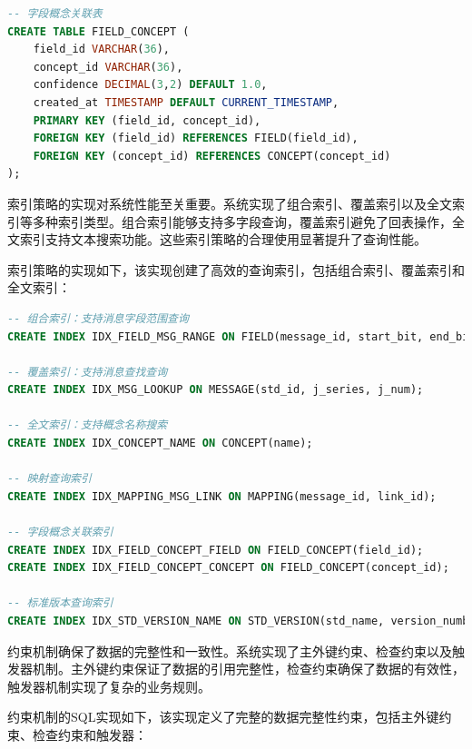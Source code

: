\begin{lstlisting}[language=SQL, label=fig:database_schema]
-- 字段概念关联表
CREATE TABLE FIELD_CONCEPT (
    field_id VARCHAR(36),
    concept_id VARCHAR(36),
    confidence DECIMAL(3,2) DEFAULT 1.0,
    created_at TIMESTAMP DEFAULT CURRENT_TIMESTAMP,
    PRIMARY KEY (field_id, concept_id),
    FOREIGN KEY (field_id) REFERENCES FIELD(field_id),
    FOREIGN KEY (concept_id) REFERENCES CONCEPT(concept_id)
);
\end{lstlisting}

索引策略的实现对系统性能至关重要。系统实现了组合索引、覆盖索引以及全文索引等多种索引类型。组合索引能够支持多字段查询，覆盖索引避免了回表操作，全文索引支持文本搜索功能。这些索引策略的合理使用显著提升了查询性能。

索引策略的实现如下，该实现创建了高效的查询索引，包括组合索引、覆盖索引和全文索引：

\begin{lstlisting}[language=SQL, label=fig:database_indexes]
-- 组合索引：支持消息字段范围查询
CREATE INDEX IDX_FIELD_MSG_RANGE ON FIELD(message_id, start_bit, end_bit);

-- 覆盖索引：支持消息查找查询
CREATE INDEX IDX_MSG_LOOKUP ON MESSAGE(std_id, j_series, j_num);

-- 全文索引：支持概念名称搜索
CREATE INDEX IDX_CONCEPT_NAME ON CONCEPT(name);

-- 映射查询索引
CREATE INDEX IDX_MAPPING_MSG_LINK ON MAPPING(message_id, link_id);

-- 字段概念关联索引
CREATE INDEX IDX_FIELD_CONCEPT_FIELD ON FIELD_CONCEPT(field_id);
CREATE INDEX IDX_FIELD_CONCEPT_CONCEPT ON FIELD_CONCEPT(concept_id);

-- 标准版本查询索引
CREATE INDEX IDX_STD_VERSION_NAME ON STD_VERSION(std_name, version_number);
\end{lstlisting}
约束机制确保了数据的完整性和一致性。系统实现了主外键约束、检查约束以及触发器机制。主外键约束保证了数据的引用完整性，检查约束确保了数据的有效性，触发器机制实现了复杂的业务规则。

约束机制的SQL实现如下，该实现定义了完整的数据完整性约束，包括主外键约束、检查约束和触发器：

